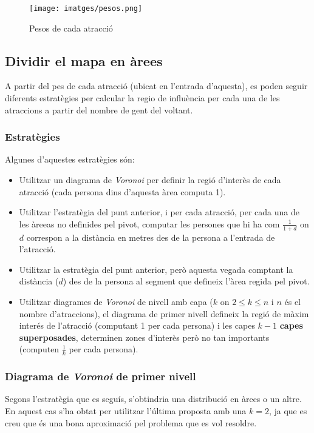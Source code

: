 \documentclass[12pt]{article}
\begin{document}
\begin{figure}[H]
	\centering
	\texttt{[image: imatges/pesos.png]}\par\vspace{1cm}
	\caption{Pesos de cada atracció}
	\label{fig:mapa_areas}
\end{figure}

\subsection{Dividir el mapa en àrees \label{arees}}
A partir del pes de cada atracció (ubicat en l'entrada d'aquesta), es poden seguir diferents estratègies per calcular la regio de influència per cada una de les atraccions a partir del nombre de gent del voltant.

\subsubsection{Estratègies}
Algunes d'aquestes estratègies són:
\begin{itemize}
	\item Utilitzar un diagrama de \textit{Voronoi} per definir la regió d'interès de cada atracció (cada persona dins d'aquesta àrea computa 1).
	\item Utilitzar l'estratègia del punt anterior, i per cada atracció, per cada una de les àreeas no definides pel pivot, computar les persones que hi ha com $\frac{1}{1+d}$ on $d$ correspon a la distància en metres des de la persona a l'entrada de l'atracció.
	\item Utilitzar la estratègia del punt anterior, però aquesta vegada comptant la distància ($d$) des de la persona al segment que defineix l'àrea regida pel pivot.
	\item Utilitzar diagrames de \textit{Voronoi} de nivell amb capa ($k$ on $2 \le k \le n$ i $n$ és el nombre d'atraccions), el diagrama de primer nivell defineix la regió de màxim interés de l'atracció (computant 1 per cada persona) i les capes $k-1$ \textbf{capes superposades}, determinen zones d'interès però no tan importants (computen $\frac{1}{k}$ per cada persona).
\end{itemize}

\subsubsection{Diagrama de \textit{Voronoi} de primer nivell}
Segons l'estratègia que es seguís, s'obtindria una distribució en àrees o un altre. En aquest cas s'ha obtat per utilitzar l'última proposta amb una $k = 2$, ja que es creu que és una bona aproximació pel problema que es vol resoldre. 
\end{document}
